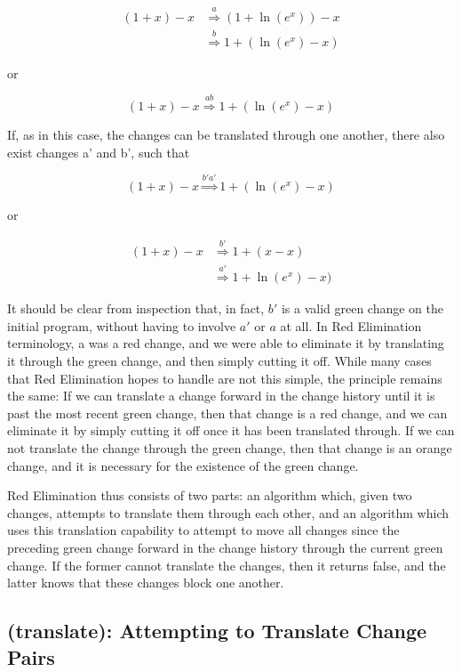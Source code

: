 \documentclass{article}
\newcommand{\insetarrow}[1]{\stackrel{#1}{\Rightarrow}}
\newcommand{\lnexp}[1]{\ln{\left(e^{#1}\right)}}
\begin{document}
\begin{align*}
(1 + x) - x&\insetarrow{a} (1 + \lnexp{x}) - x\\
&\insetarrow{b} 1 + (\lnexp{x} - x)
\end{align*}

or 

\[(1 + x) - x \insetarrow{ab} 1 + (\lnexp{x} - x)\]

If, as in this case, 
the changes can be translated through one another, 
there also exist changes a' and b', 
such that 

\[(1 + x) - x \insetarrow{b'a'} 1 + (\lnexp{x} - x)\]

or

\begin{align*}
(1 + x) - x &\insetarrow{b'} 1 + (x - x) \\
&\insetarrow{a'} 1 + \lnexp{x} - x)
\end{align*}


It should be clear from inspection that, in fact, 
$b'$ is a valid green change on the initial program, 
without having to involve $a'$ or $a$ at all. 
In Red Elimination terminology, 
a was a red change, 
and we were able to eliminate it 
by translating it through the green change, 
and then simply cutting it off. 
While many cases that Red Elimination hopes to handle 
are not this simple, 
the principle remains the same: 
If we can translate a change 
forward in the change history 
until it is past the most recent green change, 
then that change is a red change, 
and we can eliminate it by simply cutting it off 
once it has been translated through. 
If we can not translate the change through the green change, 
then that change is an orange change, 
and it is necessary for the existence of the green change.

Red Elimination thus consists of two parts: 
an algorithm which, given two changes, 
attempts to translate them through each other, 
and an algorithm which uses this translation capability 
to attempt to move all changes since the preceding green change 
forward in the change history 
through the current green change. 
If the former cannot translate the changes, 
then it returns false, 
and the latter knows that these changes block one another.

\subsection{(translate): Attempting to Translate Change Pairs}
\end{document}
